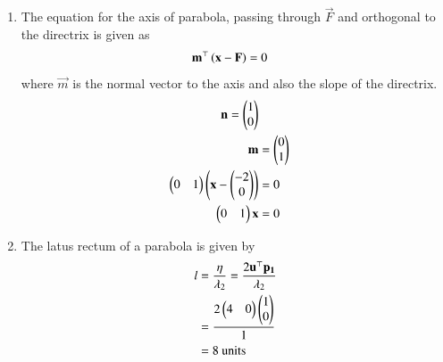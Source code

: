 \documentclass[journal,12pt,twocolumn]{IEEEtran}
\begin{document}
\begin{enumerate}
\begin{enumerate}
\item The equation for the axis of parabola, passing through $\vec{F}$ and orthogonal to the directrix is given as  
\begin{align}
\mathbf{m}^\top\left(\mathbf{x}-\mathbf{F}\right) &= 0
\label{eq:5}
\end{align}
where $\vec{m}$ is the normal vector to the axis and also the slope of the directrix.
\begin{align}
\mathbf{n} = \begin{pmatrix}1 \\ 0 \end{pmatrix}\\
\mathbf{m} &= \begin{pmatrix}0 \\ 1\end{pmatrix} \\
\begin{pmatrix}0 & 1\end{pmatrix}\begin{pmatrix}\mathbf{x} - \begin{pmatrix}-2 \\ 0\end{pmatrix}\end{pmatrix} &= 0\\
\begin{pmatrix}0 & 1\end{pmatrix}\mathbf{x} &= 0 
\end{align}
\item The latus rectum of a parabola is given by 
\begin{align}
	l &= \frac{\eta}{\lambda_2}  
	 = \frac{2\mathbf{u}^\top\mathbf{p_1}}{\lambda_2} \\
	 &= \frac{2\begin{pmatrix}4 & 0\end{pmatrix}\begin{pmatrix}1 \\ 0\end{pmatrix}}{1} \\
	 &= 8 \text{ units }
\end{align}
\end{enumerate}
\end{enumerate}
\end{document}
